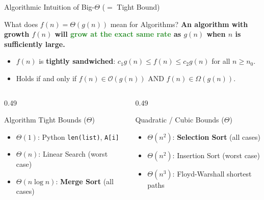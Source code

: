 \documentclass[aspectratio=169]{beamer}
\begin{document}
\begin{frame}{Algorithmic Intuition of Big-$\Theta$ ($=$ Tight Bound)}
  \begin{alertblock}{What does $f(n) = \Theta(g(n))$ mean for Algorithms?}
    \small
    \textbf{An algorithm with growth $f(n)$ will \textcolor{ForestGreen}{grow at the exact same rate} as $g(n)$ when $n$ is sufficiently large.}
    \begin{itemize}
      \item $f(n)$ is \textbf{tightly sandwiched}: $c_1 g(n) \le f(n) \le c_2 g(n)$ for all $n \ge n_0$.
      \item Holds if and only if $f(n) \in \mathcal{O}(g(n))$ AND $f(n) \in \Omega(g(n))$.
    \end{itemize}
  \end{alertblock}
  \vspace{0.2em}
  \begin{columns}[T]
    \begin{column}{0.49\textwidth}
      \begin{block}{Algorithm Tight Bounds ($\Theta$)}
        \scriptsize
        \begin{itemize}\setlength{\itemsep}{0.2em}
          \item $\Theta(1)$: Python \texttt{len(list)}, \texttt{A[i]}
          \item $\Theta(n)$: Linear Search (worst case)
          \item $\Theta(n\log n)$: \textbf{Merge Sort} (all cases)
        \end{itemize}
      \end{block}
    \end{column}
    \begin{column}{0.49\textwidth}
      \begin{block}{Quadratic / Cubic Bounds ($\Theta$)}
        \scriptsize
        \begin{itemize}\setlength{\itemsep}{0.2em}
          \item $\Theta(n^2)$: \textbf{Selection Sort} (all cases)
          \item $\Theta(n^2)$: Insertion Sort (worst case)
          \item $\Theta(n^3)$: Floyd-Warshall shortest paths
        \end{itemize}
      \end{block}
    \end{column}
  \end{columns}
\end{frame}
\end{document}
